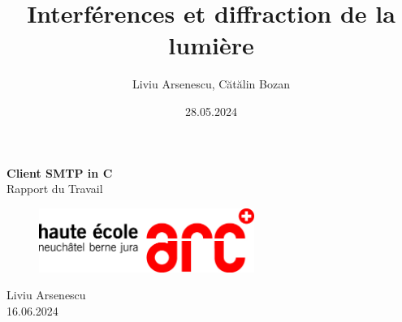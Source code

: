 \documentclass[12pt,a4paper]{article}
\title{Interférences et diffraction de la lumière}
\author{Liviu Arsenescu, Cătălin Bozan}
\date{28.05.2024}
\begin{document}
    \begin{titlepage}
        \begin{center}
            \vspace*{\fill}
            \Huge \textbf{Client SMTP in C} \\
            \Large Rapport du Travail \\
            \begin{figure}[h]
                \centering
                \includegraphics[width=7cm]{hearclogo.png}
            \end{figure}
            \vspace{\fill}
            \Large Liviu Arsenescu \\
            16.06.2024

            \vspace*{\fill}
        \end{center}
    \end{titlepage}
\end{document}
